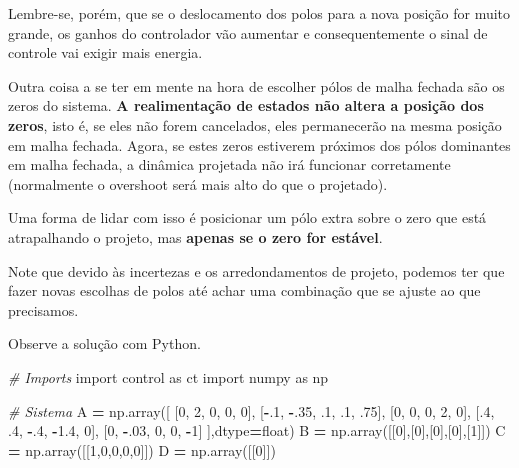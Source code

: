 \documentclass[
]{book}
\newenvironment{Shaded}{\begin{snugshade}}{\end{snugshade}}
\newcommand{\BuiltInTok}[1]{#1}
\newcommand{\CommentTok}[1]{\textcolor[rgb]{0.56,0.35,0.01}{\textit{#1}}}
\newcommand{\DecValTok}[1]{\textcolor[rgb]{0.00,0.00,0.81}{#1}}
\newcommand{\FloatTok}[1]{\textcolor[rgb]{0.00,0.00,0.81}{#1}}
\newcommand{\ImportTok}[1]{#1}
\newcommand{\NormalTok}[1]{#1}
\newcommand{\OperatorTok}[1]{\textcolor[rgb]{0.81,0.36,0.00}{\textbf{#1}}}
\begin{document}
Lembre-se, porém, que se o deslocamento dos polos para a nova posição for muito grande, os ganhos do controlador vão aumentar e consequentemente o sinal de controle vai exigir mais energia.

Outra coisa a se ter em mente na hora de escolher pólos de malha fechada são os zeros do sistema. \textbf{A realimentação de estados não altera a posição dos zeros}, isto é, se eles não forem cancelados, eles permanecerão na mesma posição em malha fechada. Agora, se estes zeros estiverem próximos dos pólos dominantes em malha fechada, a dinâmica projetada não irá funcionar corretamente (normalmente o overshoot será mais alto do que o projetado).

Uma forma de lidar com isso é posicionar um pólo extra sobre o zero que está atrapalhando o projeto, mas \textbf{apenas se o zero for estável}.

Note que devido às incertezas e os arredondamentos de projeto, podemos ter que fazer novas escolhas de polos até achar uma combinação que se ajuste ao que precisamos.



Observe a solução com Python.

\begin{Shaded}
\begin{Highlighting}[]
\CommentTok{\# Imports}
\ImportTok{import}\NormalTok{ control }\ImportTok{as}\NormalTok{ ct}
\ImportTok{import}\NormalTok{ numpy }\ImportTok{as}\NormalTok{ np}

\CommentTok{\# Sistema}
\NormalTok{A }\OperatorTok{=}\NormalTok{ np.array([  [}\DecValTok{0}\NormalTok{, }\DecValTok{2}\NormalTok{, }\DecValTok{0}\NormalTok{, }\DecValTok{0}\NormalTok{, }\DecValTok{0}\NormalTok{],}
\NormalTok{                [}\OperatorTok{{-}}\FloatTok{.1}\NormalTok{, }\OperatorTok{{-}}\FloatTok{.35}\NormalTok{, }\FloatTok{.1}\NormalTok{, }\FloatTok{.1}\NormalTok{, }\FloatTok{.75}\NormalTok{], }
\NormalTok{                [}\DecValTok{0}\NormalTok{, }\DecValTok{0}\NormalTok{, }\DecValTok{0}\NormalTok{, }\DecValTok{2}\NormalTok{, }\DecValTok{0}\NormalTok{],}
\NormalTok{                [}\FloatTok{.4}\NormalTok{, }\FloatTok{.4}\NormalTok{, }\OperatorTok{{-}}\FloatTok{.4}\NormalTok{, }\OperatorTok{{-}}\FloatTok{1.4}\NormalTok{, }\DecValTok{0}\NormalTok{],}
\NormalTok{                [}\DecValTok{0}\NormalTok{, }\OperatorTok{{-}}\FloatTok{.03}\NormalTok{, }\DecValTok{0}\NormalTok{, }\DecValTok{0}\NormalTok{, }\OperatorTok{{-}}\DecValTok{1}\NormalTok{]     ],dtype}\OperatorTok{=}\BuiltInTok{float}\NormalTok{)}
\NormalTok{B }\OperatorTok{=}\NormalTok{ np.array([[}\DecValTok{0}\NormalTok{],[}\DecValTok{0}\NormalTok{],[}\DecValTok{0}\NormalTok{],[}\DecValTok{0}\NormalTok{],[}\DecValTok{1}\NormalTok{]])}
\NormalTok{C }\OperatorTok{=}\NormalTok{ np.array([[}\DecValTok{1}\NormalTok{,}\DecValTok{0}\NormalTok{,}\DecValTok{0}\NormalTok{,}\DecValTok{0}\NormalTok{,}\DecValTok{0}\NormalTok{]])}
\NormalTok{D }\OperatorTok{=}\NormalTok{ np.array([[}\DecValTok{0}\NormalTok{]])}
\end{Highlighting}
\end{Shaded}
\end{document}
